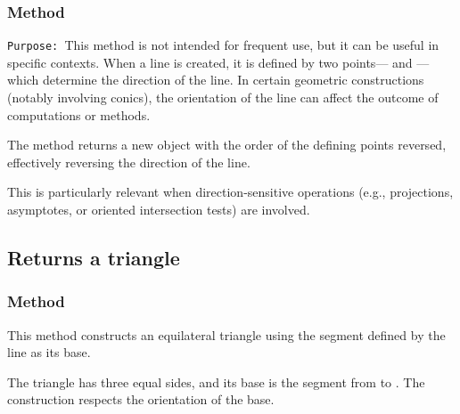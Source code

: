 \subsubsection{Method }
\label{ssub:method_line_swap__line}

\texttt{Purpose: }This method is not intended for frequent use, but it can be useful in specific contexts.
When a line is created, it is defined by two points— and —which determine the direction of the line. In certain geometric constructions (notably involving conics), the orientation of the line can affect the outcome of computations or methods.

\medskip
The  method returns a new  object with the order of the defining points reversed, effectively reversing the direction of the line.

\medskip

This is particularly relevant when direction-sensitive operations (e.g., projections, asymptotes, or oriented intersection tests) are involved.

\vspace{1em}
\begin{tkzexample}[latex=7cm]
\end{tkzexample}

\subsection{Returns a triangle}

\subsubsection{Method }
\label{ssub:method_line_equilateral}

This method constructs an equilateral triangle using the segment defined by the line as its base.

\medskip

The triangle has three equal sides, and its base is the segment from  to . The construction respects the orientation of the base.

